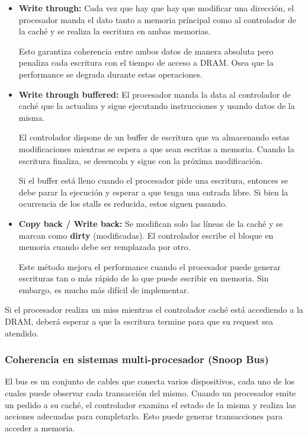 \begin{itemize}
	\item \textbf{Write through:} Cada vez que hay que hay que modificar una dirección, el procesador manda el dato tanto a memoria príncipal como al controlador de la caché y se realiza la escritura en ambas memorias. 
	
	Esto garantiza coherencia entre ambos datos de manera absoluta pero penaliza cada escritura con el tiempo de acceso a DRAM. Osea que la performance se degrada durante estas operaciones.
	
	\item \textbf{Write through buffered:} El procesador manda la data al controlador de caché que la actualiza y sigue ejecutando instrucciones y usando datos de la misma.
	
	El controlador dispone de un buffer de escritura que va almacenando estas modificaciones mientras se espera a que sean escritas a memoria. Cuando la escritura finaliza, se desencola y sigue con la próxima modificación.
	
 	Si el buffer está lleno cuando el procesador pide una escritura, entonces se debe parar la ejecución y esperar a que tenga una entrada libre. Si bien la ocurrencia de los stalls es reducida, estos siguen pasando.
 	
 	\item \textbf{Copy back / Write back:} Se modifican solo las líneas de la caché y se marcan como \textbf{dirty} (modificadas). El controlador escribe el bloque en memoria cuando debe ser remplazada por otro. 
 	
 	Este método mejora el performance cuando el procesador puede generar escrituras tan o más rápido de lo que puede escribir en memoria. Sin embargo, es mucho más difícil de implementar.
\end{itemize}

Si el procesador realiza un miss mientras el controlador caché está accediendo a la DRAM, deberá esperar a que la escritura termine para que su request sea atendido.

\subsubsection{Coherencia en sistemas multi-procesador (Snoop Bus)}


El bus es un conjunto de cables que conecta varios dispositivos, cada uno de los cuales puede observar cada transacción del mismo. Cuando un procesador emite un pedido a su caché, el controlador examina el estado de la misma y realiza las acciones adecuadas para completarlo. Esto puede generar transacciones para acceder a memoria.

